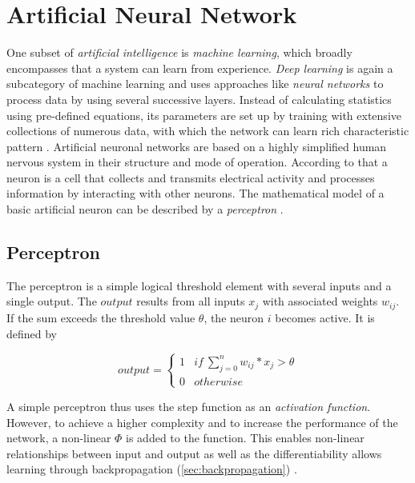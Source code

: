 
\chapter{Artificial Neural Network}

One subset of \textit{artificial intelligence} is \textit{machine learning}, which broadly encompasses that a system can learn from experience. \textit{Deep learning} is again a subcategory of machine learning and uses approaches like \textit{neural networks} to process data by using several successive layers. Instead of calculating statistics using pre-defined equations, its parameters are set up by training with extensive collections of numerous data, with which the network can learn rich characteristic pattern \cite{dl2018python}. Artificial neuronal networks are based on a highly simplified human nervous system in their structure and mode of operation. According to that a neuron is a cell that collects and transmits electrical activity and processes information by interacting with other neurons. The mathematical model of a basic artificial neuron can be described by a \textit{perceptron} \cite{computational2015intelligence}.


\section{Perceptron} \label{Perzeptron}

The perceptron is a simple logical threshold element with several inputs and a single output. The $output$ results from all inputs $x_j$ with associated weights $w_{ij}$. If the sum exceeds the threshold value $\theta$, the neuron $i$ becomes active. It is defined by


\begin{equation}
output = \begin{cases} 
        1 & if ~\sum_{j=0}^n w_{ij}*x_j > \theta \\
        0 & otherwise
        \end{cases}
\end{equation}

A simple perceptron thus uses the step function as an \textit{activation function}. However, to achieve a higher complexity and to increase the performance of the network, a non-linear $\Phi$ is added to the function. This enables non-linear relationships between input and output as well as the differentiability allows learning through backpropagation (\cref{sec:backpropagation}) \cite{computational2015intelligence}.



